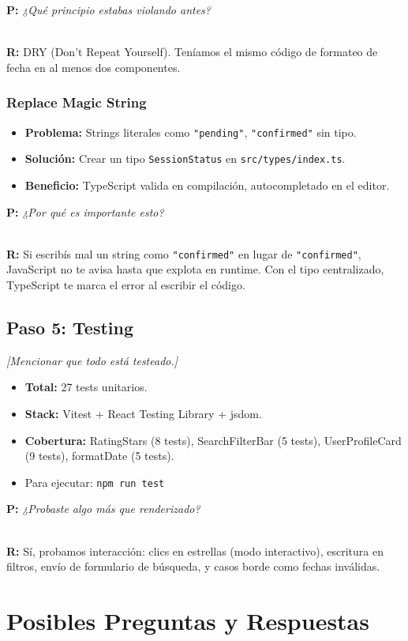 \documentclass[12pt, a4paper]{article}
\newcommand{\nota}[1]{%
  \textcolor{upds-gold}{\small\textit{[#1]}}%
}
\newcommand{\pregunta}[1]{%
  \textbf{\textcolor{upds-blue}{P:}} \textit{#1}%
}
\newcommand{\respuesta}[1]{%
  \\[2pt]\textbf{\textcolor{upds-blue}{R:}} #1%
}
\begin{document}
\pregunta{¿Qué principio estabas violando antes?}
\respuesta{DRY (Don't Repeat Yourself). Teníamos el mismo código de formateo de fecha en al menos dos componentes.}

\subsubsection{Replace Magic String}
\begin{itemize}
  \item \textbf{Problema:} Strings literales como \texttt{"pending"}, \texttt{"confirmed"} sin tipo.
  \item \textbf{Solución:} Crear un tipo \texttt{SessionStatus} en \texttt{src/types/index.ts}.
  \item \textbf{Beneficio:} TypeScript valida en compilación, autocompletado en el editor.
\end{itemize}

\pregunta{¿Por qué es importante esto?}
\respuesta{Si escribís mal un string como \texttt{"confirmed"} en lugar de \texttt{"confirmed"}, JavaScript no te avisa hasta que explota en runtime. Con el tipo centralizado, TypeScript te marca el error al escribir el código.}

\subsection{Paso 5: Testing}
\nota{Mencionar que todo está testeado.}

\begin{itemize}
  \item \textbf{Total:} 27 tests unitarios.
  \item \textbf{Stack:} Vitest + React Testing Library + jsdom.
  \item \textbf{Cobertura:} RatingStars (8 tests), SearchFilterBar (5 tests), UserProfileCard (9 tests), formatDate (5 tests).
  \item Para ejecutar: \texttt{npm run test}
\end{itemize}

\pregunta{¿Probaste algo más que renderizado?}
\respuesta{Sí, probamos interacción: clics en estrellas (modo interactivo), escritura en filtros, envío de formulario de búsqueda, y casos borde como fechas inválidas.}

\section{Posibles Preguntas y Respuestas}
\end{document}
